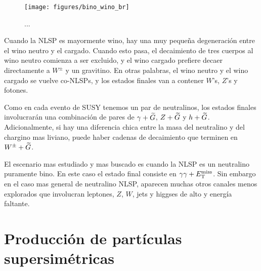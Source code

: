 \begin{figure}[h]
  \centering \texttt{[image: figures/bino\_wino\_br]}
  \caption{...}
  \label{fig:bino_wino_br}
\end{figure}

Cuando la NLSP es mayormente wino, hay una muy pequeña degeneración entre el
wino neutro y el cargado. Cuando esto pasa, el decaimiento de tres cuerpos al
wino neutro comienza a ser excluido, y el wino cargado prefiere decaer
directamente a $W^{\pm}$ y un gravitino. En otras palabras, el wino neutro y el
wino cargado se vuelve co-NLSPs, y los estados finales van a contener $W$'s,
$Z$'s y fotones.

Como en cada evento de SUSY tenemos un par de neutralinos, los estados
finales involucrarán una combinación de pares de $\gamma + \widetilde{G}$, $Z +
\widetilde{G}$ y $h + \widetilde{G}$. Adicionalmente, si hay una diferencia chica entre la masa
del neutralino y del chargino mas liviano, puede haber cadenas de decaimiento
que terminen en $W^\pm + \widetilde{G}$.

El escenario mas estudiado y mas buscado es cuando la NLSP es un neutralino
puramente bino. En este caso el estado final consiste en $\gamma\gamma + E_{\mathrm{T}}^{\mathrm{miss}}$.
Sin embargo en el caso mas general de neutralino NLSP, aparecen muchas otros
canales menos explorados que involucran leptones, $Z$, $W$, jets y higgses de
alto {\pt} y energía faltante.





\section{Producción de partículas supersimétricas}


